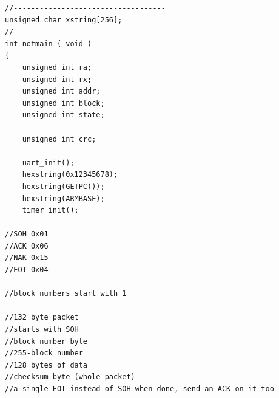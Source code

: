 \begin{lstlisting}[caption={bootloader05.c},label={lst:bootloader}]
//-----------------------------------
unsigned char xstring[256];
//-----------------------------------
int notmain ( void )
{
    unsigned int ra;
    unsigned int rx;
    unsigned int addr;
    unsigned int block;
    unsigned int state;

    unsigned int crc;

    uart_init();
    hexstring(0x12345678);
    hexstring(GETPC());
    hexstring(ARMBASE);
    timer_init();

//SOH 0x01
//ACK 0x06
//NAK 0x15
//EOT 0x04

//block numbers start with 1

//132 byte packet
//starts with SOH
//block number byte
//255-block number
//128 bytes of data
//checksum byte (whole packet)
//a single EOT instead of SOH when done, send an ACK on it too


\end{lstlisting}
